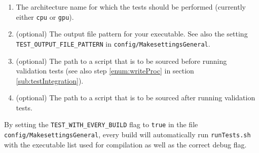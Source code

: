 {\begin{description}
\begin{enumerate}
   \item The architecture name for which the tests should be performed (currently either \verb|cpu| or \verb|gpu|).
   \item (optional) The output file pattern for your executable. See also the setting \verb|TEST_OUTPUT_FILE_PATTERN| in \verb|config/MakesettingsGeneral|.
   \item (optional) The path to a script that is to be sourced before running validation tests (see also step \ref{enum:writeProc} in section \ref{sub:testIntegration}).
   \item (optional) The path to a script that is to be sourced after running validation tests.
  \end{enumerate}
  By setting the \verb|TEST_WITH_EVERY_BUILD| flag to \verb|true| in the file \verb|config/MakesettingsGeneral|, every build will automatically run \verb|runTests.sh| with the executable list used for compilation as well as the correct debug flag.
\end{description}

}
